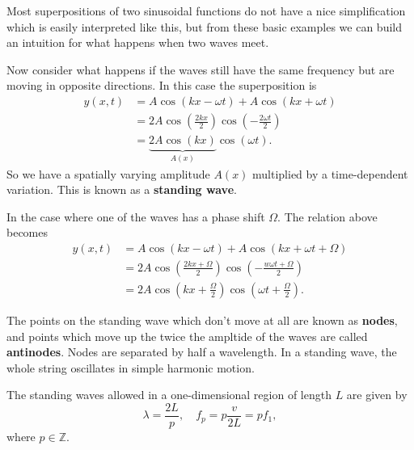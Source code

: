 \documentclass[../classical_mechanics.tex]{subfiles}
\begin{document}
        Most superpositions of two sinusoidal functions do not have a nice simplification which is easily interpreted like this, but from these basic examples we can build an intuition for what happens when two waves meet.

        Now consider what happens if the waves still have the same frequency but are moving in opposite directions.
        In this case the superposition is
        \begin{align}
            y(x,t)&=A\cos(kx-\omega t)+A\cos(kx+\omega t)\\
            &=2A\cos\left(\frac{2kx}{2}\right)\cos\left(-\frac{2\omega t}{2}\right)\\
            &=\underbrace{2A\cos(kx)}_{A(x)}\cos(\omega t).
        \end{align}
        So we have a spatially varying amplitude $A(x)$ multiplied by a time-dependent variation.
        This is known as a \textbf{standing wave}.
        \begin{example}
            In the case where one of the waves has a phase shift $\Omega$. The relation above becomes
            \begin{align}
                y(x,t)&=A\cos(kx-\omega t)+A\cos(kx+\omega t+\Omega)\\
                &=2A\cos\left(\frac{2kx+\Omega}{2}\right)\cos\left(-\frac{w\omega t+\Omega}{2}\right)\\
                &=2A\cos\left(kx+\frac{\Omega}{2}\right)\cos\left(\omega t+\frac{\Omega}{2}\right).
            \end{align}
        \end{example}

        The points on the standing wave which don't move at all are known as \textbf{nodes}, and points which move up the twice the ampltide of the waves are called \textbf{antinodes}.
        Nodes are separated by half a wavelength.
        In a standing wave, the whole string oscillates in simple harmonic motion.

        The standing waves allowed in a one-dimensional region of length $L$ are given by
        \begin{equation}
            \lambda=\frac{2L}{p},\quad f_p=p\frac{v}{2L}=pf_1,
        \end{equation}
        where $p\in\mathbb{Z}$.
\end{document}
